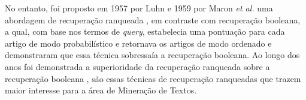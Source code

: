 No entanto, foi proposto em 1957 por Luhn e 1959 por Maron \textit{et al.} uma abordagem de recuperação ranqueada \cite[p.~1446]{Sanderson2012THIRR}, em contraste com recuperação booleana, a qual, com base nos termos de \textit{query}, estabelecia uma pontuação para cada artigo de modo probabilístico e retornava os artigos de modo ordenado e demonstraram que essa técnica sobressaía a recuperação booleana. 
Ao longo dos anos foi demonstrada a superioridade da recuperação ranqueada sobre a recuperação booleana \cite{Jones:1981:IRE:539571}, são essas técnicas de recuperação ranqueadas que trazem maior interesse para a área de Mineração de Textos.



